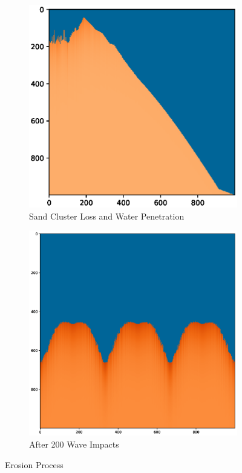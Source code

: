 \documentclass[12pt]{article}
\begin{document}
\begin{figure}[H]
    \centering
    \begin{subfigure}[a]{\linewidth}
        \includegraphics[width=\linewidth]{Figure_1.eps}
        \caption{Sand Cluster Loss and Water Penetration}
    \end{subfigure}
    \begin{subfigure}[c]{0.7\linewidth}
        \includegraphics[width=\linewidth]{Figure_2.eps}
        \caption{After 200 Wave Impacts}
    \end{subfigure}
    \label{fig:erosion_process}
    \caption{Erosion Process}
\end{figure}
\end{document}
